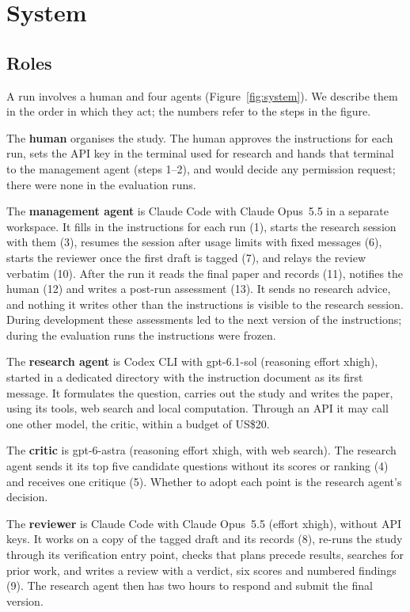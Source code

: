 \documentclass[11pt]{article}
\begin{document}
\section{System}
\label{sec:system}


\subsection{Roles}
A run involves a human and four agents (Figure~\ref{fig:system}). We describe them in the order in which they act; the numbers refer to the steps in the figure.

The \textbf{human} organises the study. The human approves the instructions for each run, sets the API key in the terminal used for research and hands that terminal to the management agent (steps 1--2), and would decide any permission request; there were none in the evaluation runs.

The \textbf{management agent} is Claude Code with Claude Opus~5.5 in a separate workspace. It fills in the instructions for each run (1), starts the research session with them (3), resumes the session after usage limits with fixed messages (6), starts the reviewer once the first draft is tagged (7), and relays the review verbatim (10). After the run it reads the final paper and records (11), notifies the human (12) and writes a post-run assessment (13). It sends no research advice, and nothing it writes other than the instructions is visible to the research session. During development these assessments led to the next version of the instructions; during the evaluation runs the instructions were frozen.

The \textbf{research agent} is Codex CLI with gpt-6.1-sol (reasoning effort xhigh), started in a dedicated directory with the instruction document as its first message. It formulates the question, carries out the study and writes the paper, using its tools, web search and local computation. Through an API it may call one other model, the critic, within a budget of US\$20.

The \textbf{critic} is gpt-6-astra (reasoning effort xhigh, with web search). The research agent sends it its top five candidate questions without its scores or ranking (4) and receives one critique (5). Whether to adopt each point is the research agent's decision.

The \textbf{reviewer} is Claude Code with Claude Opus~5.5 (effort xhigh), without API keys. It works on a copy of the tagged draft and its records (8), re-runs the study through its verification entry point, checks that plans precede results, searches for prior work, and writes a review with a verdict, six scores and numbered findings (9). The research agent then has two hours to respond and submit the final version.
\end{document}
